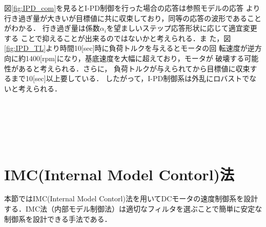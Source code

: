 \documentclass[a4paper,12pt]{jarticle}
\begin{document}
%
図\ref{fig:IPD_com}を見るとI-PD制御を行った場合の応答は参照モデルの応答
より行き過ぎ量が大きいが目標値に共に収束しており，同等の応答の波形であることがわかる．
行き過ぎ量は係数$\alpha_i$を望ましいステップ応答形状に応じて適宜変更する
ことで抑えることが出来るのではないかと考えられる\cite{kitamoripaper}．ま
た，図\ref{fig:IPD_TL}より時間10[sec]時に負荷トルクを与えるとモータの回
転速度が逆方向に約1400[rpm]になり，基底速度を大幅に超えており，モータが
破壊する可能性があると考えられる．さらに，
負荷トルクが与えられてから目標値に収束するまで10[sec]以上要している．
したがって，I-PD制御系は外乱にロバストでないと考えられる．
%
\\
\\
\\
\\
\\
\\
\newpage
\section{IMC(Internal Model Contorl)法}
本節ではIMC(Internal Model Contorl)法を用いてDCモータの速度制御系を設計
する．IMC法（内部モデル制御法）は適切なフィルタを選ぶことで簡単に安定な
制御系を設計できる手法である．
\end{document}
